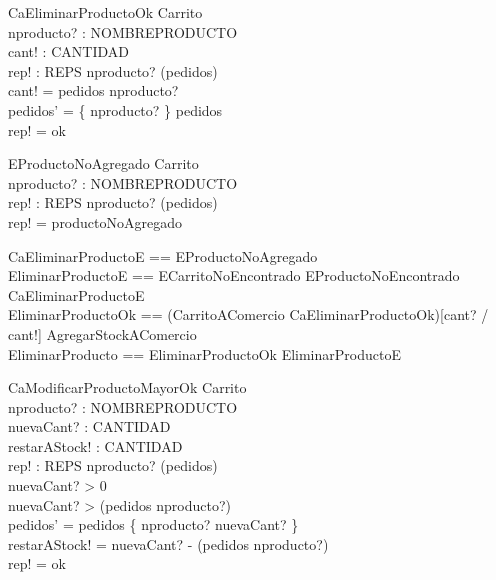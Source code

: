 \documentclass[11pt]{article}
\begin{document}

\begin{schema}{CaEliminarProductoOk}
\Delta Carrito \\
nproducto? : NOMBREPRODUCTO \\
cant! : CANTIDAD \\
rep! : REPS
\where
nproducto? \in (\dom pedidos) \\
cant! = pedidos \; nproducto? \\
pedidos' = \{ nproducto? \} \ndres pedidos \\
rep! = ok
\end{schema}

\begin{schema}{EProductoNoAgregado}
\Xi Carrito \\
nproducto? : NOMBREPRODUCTO \\
rep! : REPS
\where
nproducto? \notin (\dom pedidos) \\
rep! = productoNoAgregado
\end{schema}

\begin{zed}
CaEliminarProductoE == EProductoNoAgregado \\
EliminarProductoE == ECarritoNoEncontrado \lor EProductoNoEncontrado \lor CaEliminarProductoE \\
EliminarProductoOk == (CarritoAComercio \land CaEliminarProductoOk)[cant? / cant!] \semi AgregarStockAComercio \\
EliminarProducto == EliminarProductoOk \lor EliminarProductoE
\end{zed}


\begin{schema}{CaModificarProductoMayorOk}
\Delta Carrito \\
nproducto? : NOMBREPRODUCTO \\
nuevaCant? : CANTIDAD \\
restarAStock! : CANTIDAD \\
rep! : REPS
\where
nproducto? \in (\dom pedidos) \\
nuevaCant? > 0 \\
nuevaCant? > (pedidos \; nproducto?) \\
pedidos' = pedidos \oplus \{ nproducto? \mapsto nuevaCant? \} \\
restarAStock! = nuevaCant? - (pedidos \; nproducto?) \\
rep! = ok
\end{schema}
\end{document}
